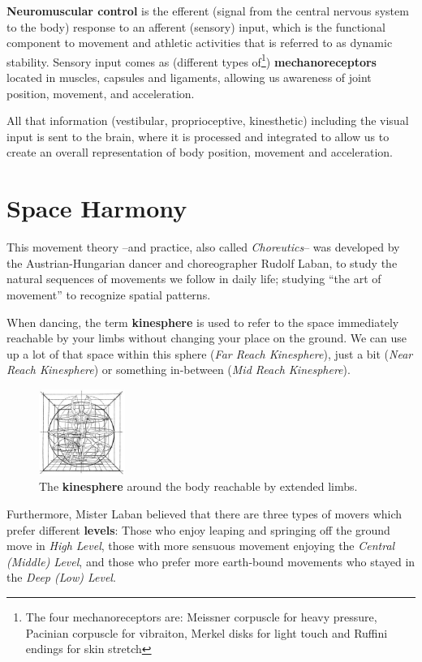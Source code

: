 \textbf{Neuromuscular control} is the efferent (signal from the central nervous system to the body) response to an afferent (sensory) input, which is the functional component to movement and athletic activities that is referred to as dynamic stability.
Sensory input comes as (different types of\footnote{The four mechanoreceptors are: Meissner corpuscle for heavy pressure, Pacinian corpuscle for vibraiton, Merkel disks for light touch and Ruffini endings for skin stretch}) \textbf{mechanoreceptors} located in muscles, capsules and ligaments, allowing us awareness of joint position, movement, and acceleration.

All that information (vestibular, proprioceptive, kinesthetic) including the visual input is sent to the brain, where it is processed and integrated to allow us to create an overall representation of body position, movement and acceleration.

\section{Space Harmony}\label{sec:space-harmony}

This movement theory --and practice, also called \textit{Choreutics}-- was developed by the Austrian-Hungarian dancer and choreographer Rudolf Laban, to study the natural sequences of movements we follow in daily life; studying ``the art of movement'' to recognize spatial patterns.

When dancing, the term \textbf{\gls{kinesphere}} is used to refer to the space immediately reachable by your limbs without changing your place on the ground.
We can use up a lot of that space within this sphere (\textit{Far Reach Kinesphere}), just a bit (\textit{Near Reach Kinesphere}) or something in-between (\textit{Mid Reach Kinesphere}).

\begin{figure}
    \centering
    \includegraphics[width=0.25\textwidth]{images/kinsphere}
    \caption{The \textbf{kinesphere} around the body reachable by extended limbs.}
\end{figure}

Furthermore, Mister Laban believed that there are three types of movers which prefer different \textbf{levels}: Those who enjoy leaping and springing off the ground move in \textit{High Level}, those with more sensuous movement enjoying the \textit{Central (Middle) Level}, and those who prefer more earth-bound movements who stayed in the \textit{Deep (Low) Level}.

